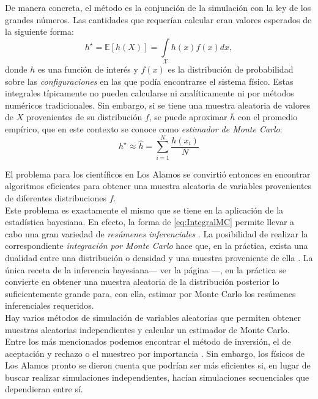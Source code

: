 De manera concreta, el método es la conjunción de la simulación con la ley de los grandes números. Las cantidades que requerían calcular eran valores esperados de la siguiente forma: 
\begin{equation}
\label{eq:IntegralMC}
h^\star = \mathbb{E}[h(X)]=\int\limits_\mathcal{X} h(x)f(x)dx ,
\end{equation} 
donde $h$ es una función de interés y $f(x)$ es la distribución de probabilidad sobre las \textit{configuraciones} en las que podía encontrarse el sistema físico. Estas integrales típicamente no pueden calcularse ni analíticamente ni por métodos numéricos tradicionales. Sin embargo, si se tiene una muestra aleatoria de valores de $X$ provenientes de su distribución $f$, se puede aproximar $\bar{h}$ con el promedio empírico, que en este contexto se conoce como \textit{estimador de Monte Carlo}: 
\begin{equation*}
h^\star \approx \hat{h} = \sum\limits_{i=1}^N \dfrac{h(x_i)}{N}
\end{equation*}

El problema para los científicos en Los Alamos se convirtió entonces en encontrar algoritmos eficientes para obtener una muestra aleatoria de variables provenientes de diferentes distribuciones $f$.\\ 

Este problema es exactamente el mismo que se tiene en la aplicación de la estadística bayesiana. En efecto, la forma de \eqref{eq:IntegralMC} permite llevar a cabo una gran variedad de \textit{resúmenes inferenciales} \parencite{GP97}. La posibilidad de realizar la correspondiente \textit{integración por Monte Carlo} hace que, en la práctica, exista una dualidad entre una distribución o densidad y una muestra proveniente de ella \parencite{SmithGelfand92}. La única receta de la inferencia bayesiana--- ver la página \pageref{receta_bayesiana}---, en la práctica se convierte en obtener una muestra aleatoria de la distribución posterior lo suficientemente grande para, con ella, estimar por Monte Carlo los resúmenes inferenciales requeridos.\\

Hay varios métodos de simulación de variables aleatorias que permiten obtener muestras aleatorias independientes y calcular un estimador de Monte Carlo. Entre los más mencionados podemos encontrar el método de inversión, el de aceptación y rechazo o el muestreo por importancia \parencites{Ross13,RobertCasella10}. Sin embargo, los físicos de Los Alamos pronto se dieron cuenta que podrían ser más eficientes si, en lugar de buscar realizar simulaciones independientes, hacían simulaciones secuenciales que dependieran entre sí. 


